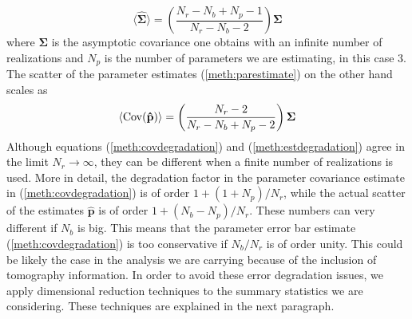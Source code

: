 \documentclass[reprint,aps,prd,superscriptaddress,showkeys,showpacs]{revtex4-1}
\newcommand{\bb}[1]{\mathbf{#1}}
\newcommand{\bbh}[1]{\mathbf{\hat{#1}}}
\begin{document}
\begin{equation}
\label{meth:covdegradation}
\langle\bbh{\Sigma}\rangle = \left(\frac{N_r-N_b+N_p-1}{N_r-N_b-2}\right)\bb{\Sigma}
\end{equation}   
%
where $\bb{\Sigma}$ is the asymptotic covariance one obtains with an infinite number of realizations and $N_p$ is the number of parameters we are estimating, in this case 3. The scatter of the parameter estimates (\ref{meth:parestimate}) on the other hand scales as 
\begin{equation}
\label{meth:estdegradation}
\langle{\rm Cov}(\bbh{p})\rangle = \left(\frac{N_r-2}{N_r-N_b+N_p-2}\right)\bb{\Sigma}
\end{equation}
%
Although equations (\ref{meth:covdegradation}) and (\ref{meth:estdegradation}) agree in the limit $N_r\rightarrow\infty$, they can be different when a finite number of realizations is used. More in detail, the degradation factor in the parameter covariance estimate in (\ref{meth:covdegradation}) is of order $1+(1+N_p)/N_r$, while the actual scatter of the estimates $\bbh{p}$ is of order $1+(N_b-N_p)/N_r$. These numbers can very different if $N_b$ is big. This means that the parameter error bar estimate (\ref{meth:covdegradation}) is too conservative if $N_b/N_r$ is of order unity. This could be likely the case in the analysis we are carrying because of the inclusion of tomography information. In order to avoid these error degradation issues, we apply dimensional reduction techniques to the summary statistics we are considering. These techniques are explained in the next paragraph.   


\end{document}
